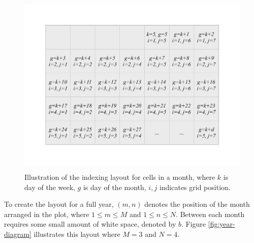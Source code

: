 \documentclass[article]{jss}
\theoremstyle{definition}
\theoremstyle{definition}
\theoremstyle{remark}
\begin{document}
\begin{CodeChunk}
\begin{figure}

{\centering \includegraphics[width=360pt,height=250pt]{figure/month} 

}

\caption[Illustration of the indexing layout for cells in
a month, where \(k\) is day of the week, \(g\) is day of the month,
\(i,j\) indicates grid position.]{Illustration of the indexing layout for cells in
a month, where \(k\) is day of the week, \(g\) is day of the month,
\(i,j\) indicates grid position.}\label{fig:month-diagram}
\end{figure}
\end{CodeChunk}





To create the layout for a full year, \((m, n)\) denotes the position of
the month arranged in the plot, where \(1 \le m \le M\) and
\(1 \le n \le N\). Between each month requires some small amount of
white space, denoted by \(b\). Figure \ref{fig:year-diagram} illustrates
this layout where \(M = 3\) and \(N = 4\).
\end{document}
